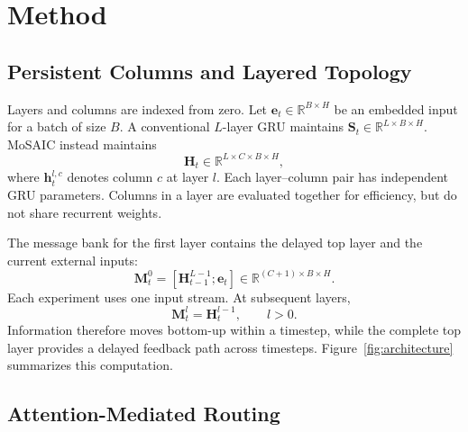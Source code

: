 \documentclass[letterpaper,twoside]{article}
\begin{document}
\section{Method}\label{sec:method}

\subsection{Persistent Columns and Layered Topology}

Layers and columns are indexed from zero. Let $\mathbf{e}_t \in \mathbb{R}^{B \times H}$ be an embedded input for a batch of size $B$. A conventional $L$-layer GRU maintains $\mathbf{S}_t \in \mathbb{R}^{L \times B \times H}$. MoSAIC instead maintains
\begin{equation}
    \mathbf{H}_t \in \mathbb{R}^{L \times C \times B \times H},
\end{equation}
where $\mathbf{h}_t^{l,c}$ denotes column $c$ at layer $l$. Each layer--column pair has independent GRU parameters. Columns in a layer are evaluated together for efficiency, but do not share recurrent weights.

The message bank for the first layer contains the delayed top layer and the current external inputs:
\begin{equation}
    \mathbf{M}_t^0 =
    [\mathbf{H}_{t-1}^{L-1}; \mathbf{e}_t]
    \in \mathbb{R}^{(C+1) \times B \times H}.
\end{equation}
Each experiment uses one input stream. At subsequent layers,
\begin{equation}
    \mathbf{M}_t^l = \mathbf{H}_t^{l-1}, \qquad l > 0.
\end{equation}
Information therefore moves bottom-up within a timestep, while the complete top layer provides a delayed feedback path across timesteps. Figure~\ref{fig:architecture} summarizes this computation.

\subsection{Attention-Mediated Routing}
\end{document}
